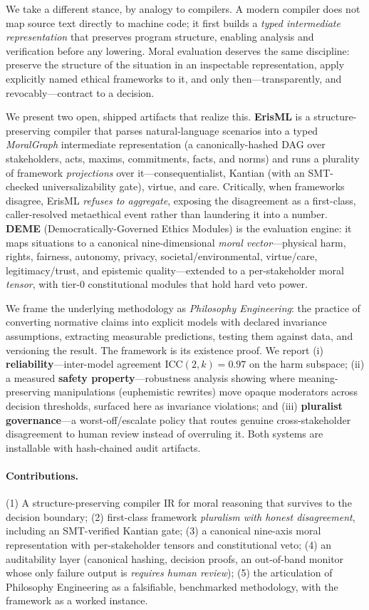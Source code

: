 We take a different stance, by analogy to compilers. A modern compiler does not map source
text directly to machine code; it first builds a \emph{typed intermediate representation}
that preserves program structure, enabling analysis and verification before any lowering.
Moral evaluation deserves the same discipline: preserve the structure of the situation in
an inspectable representation, apply explicitly named ethical frameworks to it, and only
then---transparently, and revocably---contract to a decision.

We present two open, shipped artifacts that realize this. \textbf{ErisML} is a
structure-preserving compiler that parses natural-language scenarios into a typed
\emph{MoralGraph} intermediate representation (a canonically-hashed DAG over stakeholders,
acts, maxims, commitments, facts, and norms) and runs a plurality of framework
\emph{projections} over it---consequentialist, Kantian (with an SMT-checked
universalizability gate), virtue, and care. Critically, when frameworks disagree, ErisML
\emph{refuses to aggregate}, exposing the disagreement as a first-class, caller-resolved
metaethical event rather than laundering it into a number. \textbf{DEME}
(Democratically-Governed Ethics Modules) is the evaluation engine: it maps situations to a
canonical nine-dimensional \emph{moral vector}---physical harm, rights, fairness, autonomy,
privacy, societal/environmental, virtue/care, legitimacy/trust, and epistemic
quality---extended to a per-stakeholder moral \emph{tensor}, with tier-0 constitutional
modules that hold hard veto power.

We frame the underlying methodology as \emph{Philosophy Engineering}: the practice of
converting normative claims into explicit models with declared invariance assumptions,
extracting measurable predictions, testing them against data, and versioning the result.
The framework is its existence proof. We report (i) \textbf{reliability}---inter-model
agreement ICC$(2,k)=0.97$ on the harm subspace; (ii) a measured \textbf{safety
property}---robustness analysis showing where meaning-preserving manipulations
(euphemistic rewrites) move opaque moderators across decision thresholds, surfaced here as
invariance violations; and (iii) \textbf{pluralist governance}---a worst-off/escalate
policy that routes genuine cross-stakeholder disagreement to human review instead of
overruling it. Both systems are installable with hash-chained audit artifacts.

\paragraph{Contributions.}
(1) A structure-preserving compiler IR for moral reasoning that survives to the decision
boundary; (2) first-class framework \emph{pluralism with honest disagreement}, including an
SMT-verified Kantian gate; (3) a canonical nine-axis moral representation with
per-stakeholder tensors and constitutional veto; (4) an auditability layer (canonical
hashing, decision proofs, an out-of-band monitor whose only failure output is
\emph{requires human review}); (5) the articulation of Philosophy Engineering as a
falsifiable, benchmarked methodology, with the framework as a worked instance.

